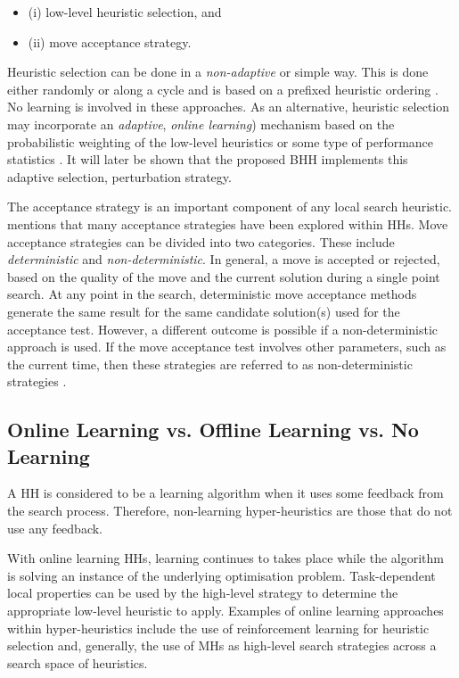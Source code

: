 \begin{itemize}
    \item (i) low-level heuristic selection, and
    \item (ii) move acceptance strategy. 
\end{itemize}

Heuristic selection can be done in a \textit{non-adaptive} or simple way. This is done either randomly or along a cycle and is based on a prefixed heuristic ordering \cite{ref:cowling:2000}. No learning is involved in these approaches. As an alternative, heuristic selection may incorporate an \textit{adaptive}, \textit{online learning}) mechanism based on the probabilistic weighting of the low-level heuristics \cite{ref:burke:2003} or some type of performance statistics \cite{ref:cowling:2000}. It will later be shown that the proposed \ac{BHH} implements this adaptive selection, perturbation strategy. 

The acceptance strategy is an important component of any local search heuristic. \cite{ref:burke:2003} mentions that many acceptance strategies have been explored within \acp{HH}. Move acceptance strategies can be divided into two categories. These include \textit{deterministic} and \textit{non-deterministic}. In general, a move is accepted or rejected, based on the quality of the move and the current solution during a single point search. At any point in the search, deterministic move acceptance methods generate the same result for the same candidate solution(s) used for the acceptance test. However, a different outcome is possible if a non-deterministic approach is used. If the move acceptance test involves other parameters, such as the current time, then these strategies are referred to as non-deterministic strategies \cite{ref:burke:2003}. 

\subsection{Online Learning vs. Offline Learning vs. No Learning}

A \ac{HH} is considered to be a learning algorithm when it uses some feedback from the search process. Therefore, non-learning hyper-heuristics are those that do not use any feedback. 

With online learning \acp{HH}, learning continues to takes place while the algorithm is solving an instance of the underlying optimisation problem. Task-dependent local properties can be used by the high-level strategy to determine the appropriate low-level heuristic to apply. Examples of online learning approaches within hyper-heuristics include the use of reinforcement learning for heuristic selection and, generally, the use of \acp{MH} as high-level search strategies across a search space of heuristics.

